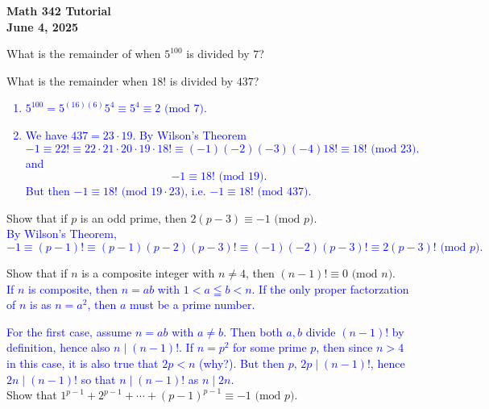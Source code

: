 \documentclass[a4paper,11pt]{article}
\theoremstyle{mythm}
\theoremstyle{mydef}
\newcommand{\blue}[1]{\textcolor{blue}{#1}}
\renewcommand{\pmod}[1]{\text{ (mod $#1$)}}
\begin{document}
\begin{center}
  {\Large\bfseries Math 342 Tutorial} \\
  {\normalsize\bf June 4, 2025}
\end{center}

\begin{enumerate*}[{\bf (a)}]
\item What is the remainder of when $5^{100}$ is divided by $7$?
\item What is the remainder when $18!$ is divided by $437$?
\end{enumerate*}

\blue{
  \begin{enumerate}[{\bf (a)}]
  \item $5^{100} = 5^{(16)(6)}5^4 \equiv 5^4 \equiv 2 \pmod{7}$.
  \item We have $437=23 \cdot 19$. By Wilson's Theorem
    \[
      -1 \equiv 22! \equiv 22 \cdot 21 \cdot 20 \cdot 19 \cdot 18! \equiv
      (-1)(-2)(-3)(-4)18! \equiv 18! \pmod{23}.
    \]
    and
    \[
      -1 \equiv 18! \pmod{19}.
    \]
    But then $-1 \equiv 18! \pmod{19 \cdot 23}$, i.e. $-1 \equiv 18!
    \pmod{437}$.
  \end{enumerate}
}

 Show that if $p$ is an odd prime, then $2(p-3) \equiv
-1 \pmod{p}$. \\

\blue{By Wilson's Theorem,
  \[
    -1 \equiv (p-1)! \equiv (p-1)(p-2)(p-3)! \equiv (-1)(-2)(p-3)! \equiv
    2(p-3)! \pmod{p}.
  \]
}

 Show that if $n$ is a composite integer with $n \neq
4$, then $(n-1)! \equiv 0 \pmod{n}$. \\

\blue{If $n$ is composite, then $n=ab$ with $1 < a \leqq b < n$. If the only
  proper factorzation of $n$ is as $n=a^2$, then $a$ must be a prime number.}

\blue{For the first case, assume $n=ab$ with $a \neq b$. Then both $a,b$ divide
  $(n-1)!$ by definition, hence also $n \mid (n-1)!$. If $n=p^2$ for some prime
  $p$, then since $n > 4$ in this case, it is also true that $2p < n$ (why?).
  But then $p,\,2p \mid (n-1)!$, hence $2n \mid (n-1)!$ so that $n \mid (n-1)!$
  as $n \mid 2n$.} \\

 Show that $1^{p-1}+2^{p-1}+\cdots+(p-1)^{p-1} \equiv
-1 \pmod{p}$. \\
\end{document}
